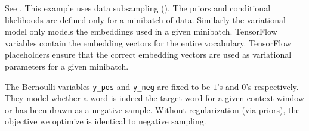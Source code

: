 See .
This example uses data subsampling (). The
priors and conditional likelihoods are defined only for a minibatch of
data. Similarly the variational model only models the embeddings used
in a given minibatch. TensorFlow variables contain the embedding
vectors for the entire vocabulary. TensorFlow placeholders ensure that
the correct embedding vectors are used as variational parameters for a
given minibatch.

The Bernoulli variables \texttt{y_pos} and \texttt{y_neg} are fixed to
be $1$'s and $0$'s respectively. They model whether a word is indeed the target word
for a given context window or has been drawn as a negative sample.
Without regularization (via priors), the objective we optimize is
identical to negative sampling.
